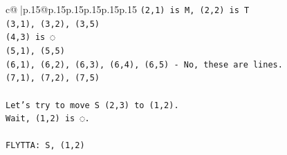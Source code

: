 \documentclass{article}
\begin{document}
{\begin{supertabular}{c@{$\;$}|p{.15\linewidth}@{}p{.15\linewidth}p{.15\linewidth}p{.15\linewidth}p{.15\linewidth}p{.15\linewidth}}
{{{\texttt{(2,1) is M, (2,2) is T} \\
\texttt{(3,1), (3,2), (3,5)} \\
\texttt{(4,3) is ◌} \\
\texttt{(5,1), (5,5)} \\
\texttt{(6,1), (6,2), (6,3), (6,4), (6,5) {-} No, these are lines.} \\
\texttt{(7,1), (7,2), (7,5)} \\
\\ 
\texttt{Let's try to move S (2,3) to (1,2).} \\
\texttt{Wait, (1,2) is ◌.} \\
\\ 
\texttt{FLYTTA: S, (1,2)} \\
            }
        }
    }
     \\ \\


\end{supertabular}}
\end{document}
